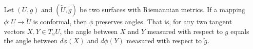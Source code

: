 Let $(U, g)$ and $(\tilde{U}, \tilde{g})$ be two surfaces with Riemannian metrics. If a mapping $\phi: U \rightarrow \tilde{U}$ is conformal, then $\phi$ preserves angles. That is, for any two tangent vectors $X, Y \in T_u U$, the angle between $X$ and $Y$ measured with respect to $g$ equals the angle between $d\phi(X)$ and $d\phi(Y)$ measured with respect to $\tilde{g}$.